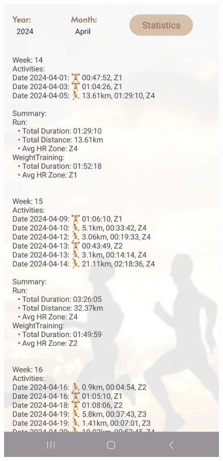 \documentclass[12pt,oneside]{memoir}
\begin{document}
\begin{figure}[h]
  \begin{minipage}{0.45\textwidth}
    \centering
    \includegraphics[scale=0.128]{assets/pictures/app_screenshots/training_stats_1.jpg}

\end{minipage}
\end{figure}
\end{document}
